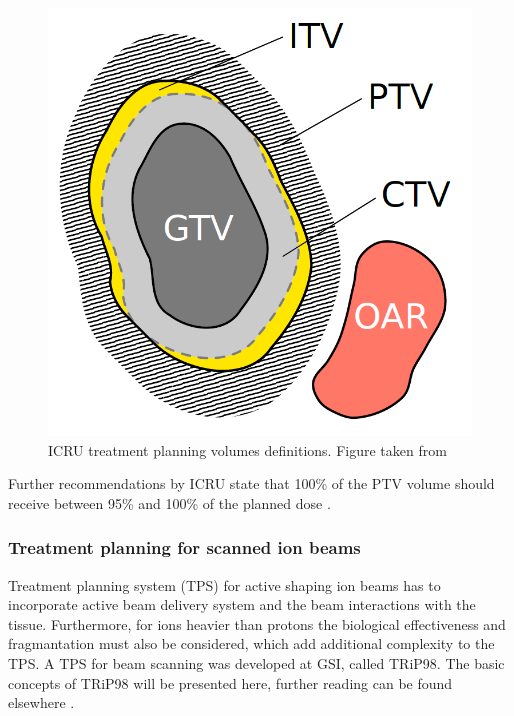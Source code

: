 \documentclass[type=dr, dr=rernat, accentcolor=tud7b,colorbacktitle, bigchapter, openright, twoside, 12pt ]{tudthesis}
\begin{document}
\begin{figure}[H]
\begin{center}
\includegraphics[scale=0.3]{./Images/volumes.png}
\caption{ICRU treatment planning volumes definitions. Figure taken from \cite{Richter2012}}
\end{center}
\end{figure}

Further recommendations by ICRU state that 100\% of the PTV volume should receive between 95\% and 100\% of the planned dose \cite{ICRU50}.


\subsubsection{Treatment planning for scanned ion beams}

Treatment planning system (TPS) for active shaping ion beams has to incorporate active beam delivery system and the beam interactions with the tissue. Furthermore, for ions heavier than protons
the biological effectiveness and fragmantation must also be considered, which add additional complexity to the TPS. A TPS for beam scanning was developed at GSI, called TRiP98. The basic concepts of TRiP98 will be
presented here, further reading can be found elsewhere \cite{Kraemer2000,Kraemer2000a}.
\end{document}
